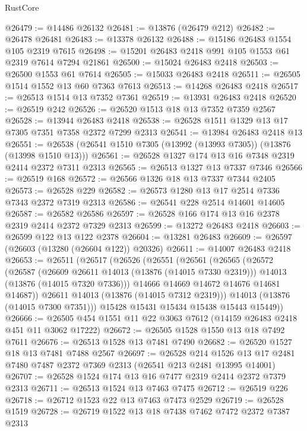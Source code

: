 \begin{lexlean}{RustCore}
\begin{coremodule}
@26479 := @14486 @26132
@26481 := @13876 (@26479 @212)
@26482 := @26478 @26481
@26483 := @13378 @26132
@26488 := @15186 @26483 @1554 @105 @2319 @7615
@26498 := @15201 @26483 @2418 @991 @105 @1553 @61 @2319 @7614 @7294 @21861
@26500 := @15024 @26483 @2418
@26503 := @26500 @1553 @61 @7614
@26505 := @15033 @26483 @2418
@26511 := @26505 @1514 @1552 @13 @60 @7363 @7613
@26513 := @14268 @26483 @2418
@26517 := @26513 @1514 @13 @7352 @7361
@26519 := @13931 @26483 @2418
@26520 := @26519 @242
@26526 := @26520 @1513 @18 @13 @7352 @7359 @2567
@26528 := @13944 @26483 @2418
@26538 := @26528 @1511 @1329 @13 @17 @7305 @7351 @7358 @2372 @7299 @2313
@26541 := @13984 @26483 @2418 @13
@26551 := @26538 (@26541 @1510 @7305 (@13992 (@13993 @7305)) (@13876 (@13998 @1510 @13)))
@26561 := @26528 @1327 @174 @13 @16 @7348 @2319 @2414 @2372 @7311 @2313
@26565 := @26513 @1327 @13 @7337 @7346
@26566 := @26519 @168
@26572 := @26566 @1326 @18 @13 @7337 @7344 @2405
@26573 := @26528 @229
@26582 := @26573 @1280 @13 @17 @2514 @7336 @7343 @2372 @7319 @2313
@26586 := @26541 @228 @2514 @14601 @14605
@26587 := @26582 @26586
@26597 := @26528 @166 @174 @13 @16 @2378 @2319 @2414 @2372 @7329 @2313
@26599 := @13272 @26483 @2418
@26603 := @26599 @122 @13 @122 @2378
@26604 := @13281 @26483
@26609 := @26597 (@26603 (@13280 (@26604 @122)) @20326)
@26611 := @14007 @26483 @2418
@26653 := @26511
    (@26517
      (@26526
        (@26551
          (@26561
            (@26565
              (@26572
                (@26587
                  (@26609 @26611 @14013 (@13876 (@14015 @7330 @2319)))
                  @14013
                  (@13876 (@14015 @7320 @7336)))
                @14666
                @14669
                @14672
                @14676
                @14681
                @14687))
            @26611
            @14013
            (@13876 (@14015 @7312 @2319)))
          @14013
          (@13876 (@14015 @7300 @7351)))
        @15428
        @15431
        @15434
        @15438
        @15443
        @15449))
@26666 := @26505 @454 @1551 @11 @22 @3063 @7612 (@14159 @26483 @2418 @451 @11 @3062 @17222)
@26672 := @26505 @1528 @1550 @13 @18 @7492 @7611
@26676 := @26513 @1528 @13 @7481 @7490
@26682 := @26520 @1527 @18 @13 @7481 @7488 @2567
@26697 := @26528
    @214
    @1526
    @13
    @17
    @2481
    @7480
    @7487
    @2372
    @7369
    @2313
    (@26541 @213 @2481 @13995 @14001)
@26707 := @26528 @1524 @174 @13 @16 @7477 @2319 @2414 @2372 @7379 @2313
@26711 := @26513 @1524 @13 @7463 @7475
@26712 := @26519 @226
@26718 := @26712 @1523 @22 @13 @7463 @7473 @2529
@26719 := @26528 @1519
@26728 := @26719 @1522 @13 @18 @7438 @7462 @7472 @2372 @7387 @2313

\end{coremodule}
\end{lexlean}
